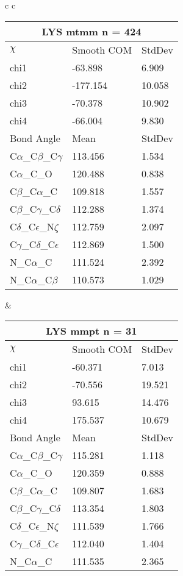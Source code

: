 \begin{longtable}{ c c }
  \begin{tabular}{ l l l }
  \toprule
  \multicolumn{3}{c}{LYS \textbf{mtmm} n = 424} \\ \toprule
  $\chi$       & Smooth COM & StdDev \\ \midrule
  chi1 & -63.898 & 6.909 \\ 
  chi2 & -177.154 & 10.058 \\ 
  chi3 & -70.378 & 10.902 \\ 
  chi4 & -66.004 & 9.830 \\ \midrule
  Bond Angle   & Mean     & StdDev \\ \midrule
  C$\alpha$\_C$\beta$\_C$\gamma$ & 113.456 & 1.534\\
  C$\alpha$\_C\_O & 120.488 & 0.838\\
  C$\beta$\_C$\alpha$\_C & 109.818 & 1.557\\
  C$\beta$\_C$\gamma$\_C$\delta$ & 112.288 & 1.374\\
  C$\delta$\_C$\epsilon$\_N$\zeta$ & 112.759 & 2.097\\
  C$\gamma$\_C$\delta$\_C$\epsilon$ & 112.869 & 1.500\\
  N\_C$\alpha$\_C & 111.524 & 2.392\\
  N\_C$\alpha$\_C$\beta$ & 110.573 & 1.029\\
  \bottomrule
  \end{tabular}
  &
  \begin{tabular}{ l l l }
  \toprule
  \multicolumn{3}{c}{LYS \textbf{mmpt} n = 31} \\ \toprule
  $\chi$       & Smooth COM & StdDev \\ \midrule
  chi1 & -60.371 & 7.013 \\ 
  chi2 & -70.556 & 19.521 \\ 
  chi3 & 93.615 & 14.476 \\ 
  chi4 & 175.537 & 10.679 \\ \midrule
  Bond Angle   & Mean     & StdDev \\ \midrule
  C$\alpha$\_C$\beta$\_C$\gamma$ & 115.281 & 1.118\\
  C$\alpha$\_C\_O & 120.359 & 0.888\\
  C$\beta$\_C$\alpha$\_C & 109.807 & 1.683\\
  C$\beta$\_C$\gamma$\_C$\delta$ & 113.354 & 1.803\\
  C$\delta$\_C$\epsilon$\_N$\zeta$ & 111.539 & 1.766\\
  C$\gamma$\_C$\delta$\_C$\epsilon$ & 112.040 & 1.404\\
  N\_C$\alpha$\_C & 111.535 & 2.365\\

\end{tabular}
\end{longtable}
